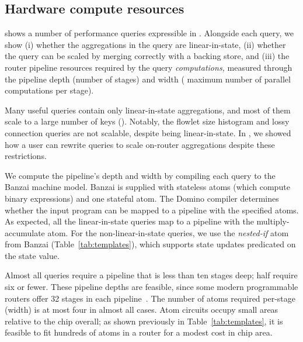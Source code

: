 \subsection{Hardware compute resources}
\label{s:eval:hardware}
\label{sec:eval:hardware}

 shows a number of performance queries
expressible in \TheSystem. Alongside each query, we show (i) whether the
aggregations in the query are linear-in-state, (ii) whether the query can be
scaled by merging correctly with a backing store, and
(iii) the router pipeline resources required by the query {\em computations,}
measured through the pipeline depth (\ie number of stages) and width (\ie
maximum number of parallel computations per stage).

Many useful queries contain only linear-in-state aggregations, and most of them
scale to a large number of keys (). Notably,
the flowlet size histogram and lossy connection queries are not scalable,
despite being linear-in-state. In , we showed how a
user can rewrite queries to scale on-router aggregations despite these
restrictions.

We compute the pipeline's depth and width by compiling each query to the Banzai
machine model. Banzai is supplied with stateless atoms (which compute binary
expressions) and one stateful atom. The Domino compiler determines whether the
input program can be mapped to a pipeline with the specified atoms. As
expected, all the linear-in-state queries map to a pipeline with the
multiply-accumulate atom. For the non-linear-in-state queries, we use the {\em
nested-if} atom from Banzai (Table~\ref{tab:templates}), which supports state updates predicated on the
state value.

Almost all queries require a pipeline that is less than ten stages deep; half
require six or fewer. These pipeline depths are feasible, since some modern
programmable routers offer 32 stages in each pipeline~\cite{rmt}. The number of
atoms required per-stage (width) is at most four in almost all cases.  Atom
circuits occupy small areas relative to the chip overall; as shown previously in
Table~\ref{tab:templates}, it is feasible to fit hundreds of atoms in a router
for a modest cost in chip area.
